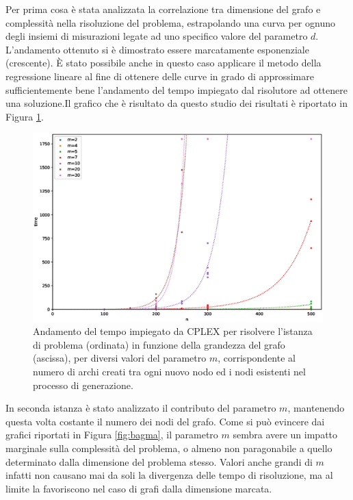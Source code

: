 Per prima cosa è stata analizzata la correlazione tra dimensione del grafo e complessità nella risoluzione del problema, estrapolando una curva per ognuno degli insiemi di misurazioni legate ad uno specifico valore del parametro $d$.  L'andamento ottenuto si è dimostrato essere marcatamente esponenziale (crescente). È stato possibile anche in questo caso applicare il metodo della regressione lineare al fine di ottenere delle curve in grado di approssimare sufficientemente bene l'andamento del tempo impiegato dal risolutore ad ottenere una soluzione.Il grafico che è risultato da questo studio dei risultati è riportato in Figura \ref{fig:bag1}.
\vspace{-0.5cm}  
\begin{figure}[h!]
     \centering
       \includegraphics[scale=0.5]{images/bag.eps}
       \vspace{-0.5cm}  
       \caption{Andamento del tempo impiegato da CPLEX per risolvere l'istanza di problema (ordinata) in funzione della grandezza del grafo (ascissa), per diversi valori del parametro $m$, corrispondente al numero di archi creati tra ogni nuovo nodo ed i nodi esistenti nel processo di generazione.}      
      
        \label{fig:bag1}
\end{figure}

In seconda istanza è stato analizzato il contributo del parametro $m$, mantenendo questa volta costante il numero dei nodi del grafo. Come si può evincere dai grafici riportati in Figura \ref{fig:bagma}, il parametro $m$ sembra avere un impatto marginale sulla complessità del problema, o almeno non paragonabile a quello determinato dalla dimensione del problema stesso. Valori anche grandi di $m$ infatti non causano mai da soli la divergenza delle tempo di risoluzione, ma al limite la favoriscono nel caso di grafi dalla dimensione marcata. 

